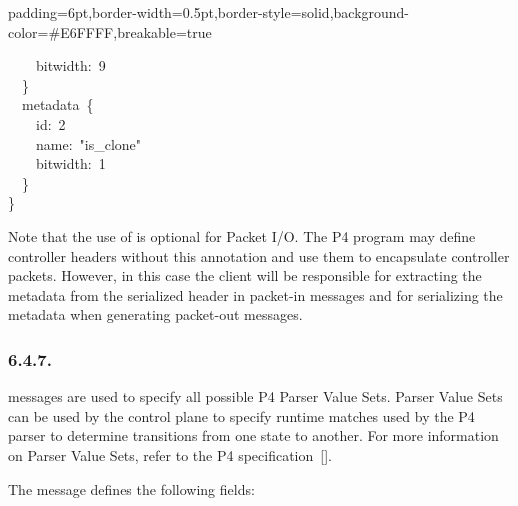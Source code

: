 \documentclass[11pt]{article}
\begin{document}
{\begin{mdbmargintb}{6pt}{6pt}
\begin{mdblock}{padding=6pt,border-width=0.5pt,border-style=solid,background-color=\#E6FFFF,breakable=true}
\begin{mdpre}
{{~~~~bitwidth:~{9}\\
~~\}\\
~~metadata~\{\\
~~~~id:~{2}\\
~~~~name:~{"}{is\_clone}{"}\\
~~~~bitwidth:~{1}\\
~~\}\\
\}}}%
\end{mdpre}%
\end{mdblock}%
\end{mdbmargintb}%

\noindent{}Note that the use of  is optional for Packet I/O. The P4
program may define controller headers without this annotation and use them to
encapsulate controller packets. However, in this case the client will be
responsible for extracting the metadata from the serialized header in packet-in
messages and for serializing the metadata when generating packet-out messages.%

\subsubsection{6.4.7.\hspace*{0.5em}}\label{sec-valueset}%

\noindent{} messages are used to specify all possible P4 Parser Value
Sets. Parser Value Sets can be used by the control plane to specify runtime
matches used by the P4 parser to determine transitions from one state to
another. For more information on Parser Value Sets, refer to the P4
specification~[].%

The  message defines the following fields:%

\begin{itemize}%


\end{itemize}}
\end{document}
